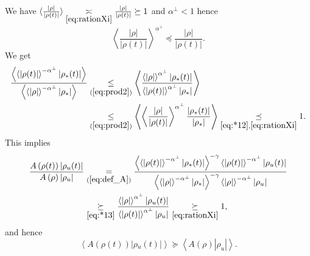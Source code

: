 \documentclass[10pt]{amsart}
\theoremstyle{definition}\newtheorem{defi}[theo]{Definition}\newtheorem{rema}[theo]{Remark}\newtheorem{exam}[theo]{Example}\newtheorem{exem}[theo]{Example}\newtheorem{nota}[theo]{Notation}
\newcommand*\eq[1]{\underset{(#1)}{=}}
\newcommand*\ineq[1]{\underset{(#1)}{\leq}}
\begin{document}
We have $\langle \frac{|\rho|}{|\rho(t)|}\rangle \underset{\eqref{eq:rationXi}}{\asymp}\frac{|\rho|}{|\rho(t)|}\succeq1$ and $\alpha^{\perp}<1$ hence
\begin{equation}\label{eq:*12}
\left\langle \frac{|\rho|}{|\rho(t)|}\right\rangle ^{\alpha^{\perp}}\preceq\frac{|\rho|}{|\rho(t)|}.
\end{equation}
We get
\begin{equation}\label{eq:*13}
\begin{split}
\frac{\left\langle \left\langle \left|\rho(t)\right|\right\rangle ^{-\alpha^{\perp}}\left|\rho_{*}(t)\right|\right\rangle }{\left\langle \left\langle \left|\rho\right|\right\rangle ^{-\alpha^{\perp}}\left|\rho_{*}\right|\right\rangle } &\ineq{\ref{eq:prod2}}\left\langle \frac{\left\langle \left|\rho\right|\right\rangle ^{\alpha^{\perp}}\left|\rho_{*}(t)\right|}{\left\langle \left|\rho(t)\right|\right\rangle ^{\alpha^{\perp}}\left|\rho_{*}\right|}\right\rangle\\ &\ineq{\ref{eq:prod2}}\left\langle \left\langle \frac{|\rho|}{|\rho(t)|}\right\rangle ^{\alpha^{\perp}}\frac{\left|\rho_{*}(t)\right|}{\left|\rho_{*}\right|}\right\rangle \underset{\eqref{eq:*12},\eqref{eq:rationXi}}{\preceq}1.
\end{split}
\end{equation}
This implies
\begin{align*}
\frac{A\left(\rho(t)\right)\left|\rho{}_{u}(t)\right|}{A\left(\rho\right)\left|\rho{}_{u}\right|}&\eq{\ref{eq:def_A}}\frac{\left\langle \left\langle \left|\rho(t)\right|\right\rangle ^{-\alpha^{\perp}}\left|\rho_{*}(t)\right|\right\rangle ^{-\gamma}\left\langle \left|\rho(t)\right|\right\rangle ^{-\alpha^{\perp}}\left|\rho{}_{u}(t)\right|}{\left\langle \left\langle \left|\rho\right|\right\rangle ^{-\alpha^{\perp}}\left|\rho_{*}\right|\right\rangle ^{-\gamma}\left\langle \left|\rho\right|\right\rangle ^{-\alpha^{\perp}}\left|\rho{}_{u}\right|}\\
&\underset{\eqref{eq:*13}}{\succeq}\frac{\left\langle \left|\rho\right|\right\rangle ^{\alpha^{\perp}}\left|\rho{}_{u}(t)\right|}{\left\langle \left|\rho(t)\right|\right\rangle ^{\alpha^{\perp}}\left|\rho{}_{u}\right|}\underset{\eqref{eq:rationXi}}{\succeq}1,
\end{align*}
and hence
\begin{equation}\label{eq:Au}
\left\langle A\left(\rho(t)\right)\left|\rho{}_{u}(t)\right|\right\rangle \succeq\left\langle A\left(\rho\right)\left|\rho_{u}\right|\right\rangle.
\end{equation}
\end{document}
